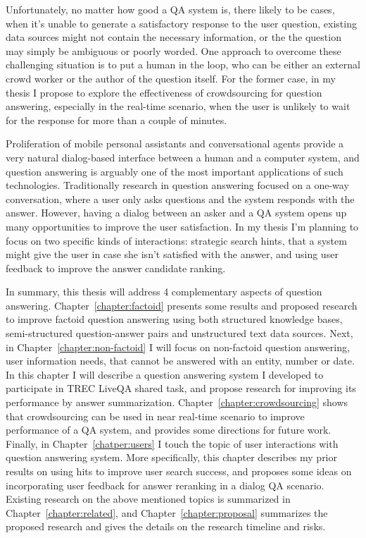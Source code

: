 Unfortunately, no matter how good a QA system is, there likely to be cases, when it's unable to generate a satisfactory response to the user question, \eg existing data sources might not contain the necessary information, or the the question may simply be ambiguous or poorly worded.
One approach to overcome these challenging situation is to put a human in the loop, who can be either an external crowd worker or the author of the question itself.
For the former case, in my thesis I propose to explore the effectiveness of crowdsourcing for question answering, especially in the real-time scenario, when the user is unlikely to wait for the response for more than a couple of minutes.

Proliferation of mobile personal assistants and conversational agents provide a very natural dialog-based interface between a human and a computer system, and question answering is arguably one of the most important applications of such technologies.
Traditionally research in question answering focused on a one-way conversation, where a user only asks questions and the system responds with the answer.
However, having a dialog between an asker and a QA system opens up many opportunities to improve the user satisfaction.
In my thesis I'm planning to focus on two specific kinds of interactions: strategic search hints, that a system might give the user in case she isn't satisfied with the answer, and using user feedback to improve the answer candidate ranking.

In summary, this thesis will address 4 complementary aspects of question answering.
Chapter~\ref{chapter:factoid} presents some results and proposed research to improve factoid question answering using both structured knowledge bases, semi-structured question-answer pairs and unstructured text data sources.
Next, in Chapter~\ref{chapter:non-factoid} I will focus on non-factoid question answering, \ie user information needs, that cannot be answered with an entity, number or date.
In this chapter I will describe a question answering system I developed to participate in TREC LiveQA shared task, and propose research for improving its performance by answer summarization.
Chapter~\ref{chapter:crowdsourcing} shows that crowdsourcing can be used in near real-time scenario to improve performance of a QA system, and provides some directions for future work.
Finally, in Chapter~\ref{chatper:users} I touch the topic of user interactions with question answering system.
More specifically, this chapter describes my prior results on using hits to improve user search success, and proposes some ideas on incorporating user feedback for answer reranking in a dialog QA scenario.
Existing research on the above mentioned topics is summarized in Chapter~\ref{chapter:related}, and Chapter~\ref{chapter:proposal} summarizes the proposed research and gives the details on the research timeline and risks.

